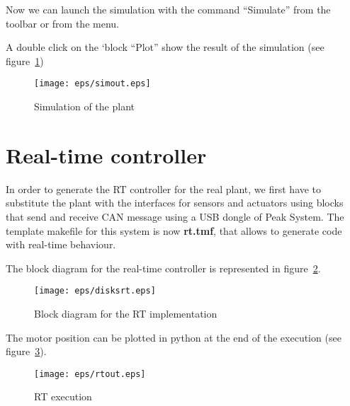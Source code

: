 Now we can launch the simulation with the command ``Simulate'' from the toolbar 
or from the menu.

A double click on the `block ``Plot'' show the result of the simulation (see 
figure~\ref{F22})

\begin{figure}[htbp]	%
\centering
\texttt{[image: eps/simout.eps]}
\caption{Simulation of the plant}
\label{F22}
\end{figure}

\section{Real-time controller}

In order to generate the RT controller for the real plant, we first have to 
substitute the plant with the interfaces for sensors and actuators using blocks 
that send and receive CAN message using a USB dongle of Peak System. The 
template makefile for this system is now \textbf{rt.tmf}, that allows to 
generate code with real-time behaviour.

The block diagram for the real-time controller is represented in 
figure~\ref{F23}.

\begin{figure}[htbp]	%
\centering
\texttt{[image: eps/disksrt.eps]}
\caption{Block diagram for the RT implementation}
\label{F23}
\end{figure}

The motor position can be plotted in python at the end of the execution (see 
figure~\ref{F24}).

\begin{figure}[htbp]	%
\centering
\texttt{[image: eps/rtout.eps]}
\caption{RT execution}
\label{F24}
\end{figure}

